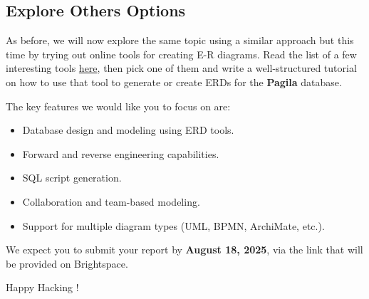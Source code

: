 \documentclass{article}
\begin{document}
\subsection{Explore Others Options}
As before, we will now explore the same topic using a similar approach but this time by trying out online tools for creating E-R diagrams. Read the list of a few interesting tools \href{https://drive.google.com/file/d/1FEkgTJEXY07AtVxIYr1_qq0naw3rmOpu/view?usp=sharing}{here}, then pick one of them and write a well-structured tutorial on how to use that tool to generate or create ERDs for the \textbf{Pagila} database.

The key features we would like you to focus on are:

\begin{itemize}
    \item Database design and modeling using ERD tools.
    \item Forward and reverse engineering capabilities.
    \item SQL script generation.
    \item Collaboration and team-based modeling.
    \item Support for multiple diagram types (UML, BPMN, ArchiMate, etc.).
\end{itemize}

We expect you to submit your report by \textbf{August 18, 2025}, via the link that will be provided on Brightspace.

\vspace{5mm}
Happy Hacking !
\end{document}
